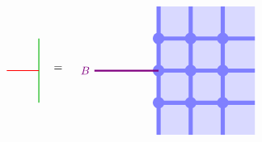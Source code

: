 \documentclass[report,paper=a4, fontsize=12pt, line_length=16cm, number_of_lines=33,dvipdfmx]{jlreq}
\numberwithin{equation}{chapter}
\begin{document}
\begin{align}
    \begin{tikzpicture}[baseline=0]
        \draw[darkgreen,thick] (0,1)--(0,-1);
        \draw[red,thick] (-1,0)--(0,0);
    \end{tikzpicture}
    \quad
    =\quad
    \begin{tikzpicture}[baseline=0cm]
        \foreach \x in {0,1,2}{
            \foreach \y in {-2,-1,...,1}{
            \fill[plaqblue](\x,\y) rectangle (\x+1,\y+1);
            }
        }
        \foreach \x in {0,1,2}{
            \foreach \y in {-1,0,1}{
                \fill[linkblue] (\x,\y) circle (1.8mm);
            }
        }
        \foreach \x in {0,1,2}{
            \foreach \y in {-1,0,1}{
                \draw[linkblue, line width = 1.3mm](\x,\y)--(\x + 1,\y);
            }
        }
        \foreach \x in {0,1,2}{
            \foreach \y in {-2,-1,...,1}{
                \draw[linkblue, line width = 1.3mm](\x,\y)--(\x,\y + 1);
            }
        }
        \draw[red!50!blue, ultra thick](0,0)--(-2,0) node[left]{$B$};
    \end{tikzpicture}        
\end{align}
\end{document}
